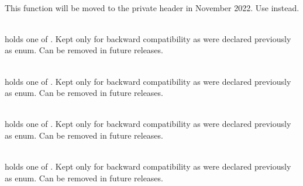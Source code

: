 \begin{DoxyRefList}
\item[Member \doxylink{group__aps__management__service_ga27c4de168f08f2551243686eb2b67cb0}{zb\+\_\+apsme\+\_\+unbind\+\_\+request} (\doxylink{group__base__types_gab70639e9bf73b53fe4a24b8fd4467082}{zb\+\_\+uint8\+\_\+t} param)]\hfill \\
\label{deprecated__deprecated000007}%
%
This function will be moved to the private header in November 2022. Use  instead.  
\item[Member \doxylink{group__zdo__bind_ga3a1f8397ef58a0b2e7c7db431386814e}{zb\+\_\+bind\+\_\+dst\+\_\+addr\+\_\+mode\+\_\+t} ]\hfill \\
\label{deprecated__deprecated000017}%
%
holds one of . Kept only for backward compatibility as  were declared previously as enum. Can be removed in future releases.  
\item[Member \doxylink{group__buf_gab4590df4d3fd9b8f78d33ad87279b8d8}{zb\+\_\+buf\+\_\+flags\+\_\+bm\+\_\+t} ]\hfill \\
\label{deprecated__deprecated000013}%
%
holds one of . Kept only for backward compatibility as  were declared previously as enum. Can be removed in future releases.  
\item[Member \doxylink{group__af__common__constants_ga430be9ce3735736c1081109387607815}{zb\+\_\+power\+\_\+src\+\_\+t} ]\hfill \\
\label{deprecated__deprecated000002}%
%
holds one of . Kept only for backward compatibility as  were declared previously as enum. Can be removed in future releases.  
\item[Member \doxylink{group__zb__comm__signals_ga854584db6dd92557770108bc73d6b5e0}{zb\+\_\+zdo\+\_\+authorization\+\_\+type\+\_\+t} ]\hfill \\
\label{deprecated__deprecated000014}%
%
holds one of . Kept only for backward compatibility as  were declared previously as enum. Can be removed in future releases.  

\end{DoxyRefList}
